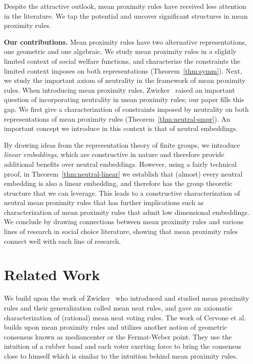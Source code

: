 \documentclass[prodmode,acmec]{ec-acmsmall}
\begin{document}
Despite the attractive outlook, mean proximity rules have received less attention in the literature. We tap the potential and uncover significant structures in mean proximity rules. 

\noindent \textbf{Our contributions.} Mean proximity rules have two alternative representations, one geometric and one algebraic. We study mean proximity rules in a slightly limited context of social welfare functions, and characterize the constraints the limited context imposes on both representations (Theorem~\ref{thm:symm}). Next, we study the important axiom of neutrality in the framework of mean proximity rules. When introducing mean proximity rules, Zwicker~ raised an important question of incorporating neutrality in mean proximity rules; our paper fills this gap. We first give a characterization of constraints imposed by neutrality on both representations of mean proximity rules (Theorem~\ref{thm:neutral-smpr}). An important concept we introduce in this context is that of neutral embeddings. 

By drawing ideas from the representation theory of finite groups, we introduce \emph{linear embeddings}, which are constructive in nature and therefore provide additional benefits over neutral embeddings. However, using a fairly technical proof, in Theorem~\ref{thm:neutral-linear} we establish that (almost) every neutral embedding is also a linear embedding, and therefore has the group theoretic structure that we can leverage. This leads to a constructive characterization of neutral mean proximity rules that has further implications such as characterization of mean proximity rules that admit low dimensional embeddings. We conclude by drawing connections between mean proximity rules and various lines of research in social choice literature, showing that mean proximity rules connect well with each line of research. 

\section{Related Work}
\label{sec:related}

We build upon the work of Zwicker~ who introduced and studied mean proximity rules and their generalization called mean neat rules, and gave an axiomatic characterization of (rational) mean neat voting rules. The work of Cervone et al.~ builds upon mean proximity rules and utilizes another notion of geometric consensus known as mediancenter or the Fermat-Weber point. They use the intuition of a rubber band and each voter exerting force to bring the consensus close to himself which is similar to the intuition behind mean proximity rules. 
\end{document}
